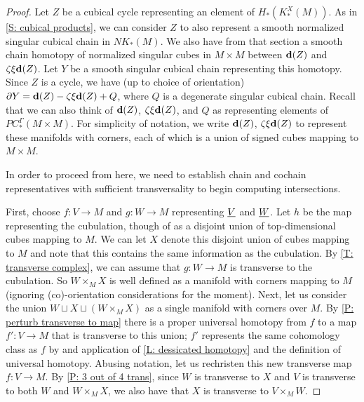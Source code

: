 \documentclass{amsart}
\begin{document}
\begin{proof}
Let $Z$ be a cubical cycle representing an element of $H_*(K_*^X(M))$. As in \cref{S: cubical products}, we can consider $Z$ to also represent a smooth normalized singular cubical chain in $NK_*(M)$. We also have from that section a smooth chain homotopy of normalized singular cubes  in $M\times M$ between $\mathbf{d}(Z)$ and $\zeta\xi\mathbf{d}(Z)$. Let $Y$ be a smooth singular cubical chain representing this homotopy. Since $Z$ is a cycle, we have (up to choice of orientation) $\partial Y=\mathbf{d}(Z)-\zeta\xi\mathbf{d}(Z)+Q$, where $Q$ is a degenerate singular cubical chain. Recall that we can also think of $\mathbf{d}(Z)$, $\zeta\xi\mathbf{d}(Z)$, and $Q$ as representing elements of $PC^\Gamma_*(M\times M)$. For simplicity of notation, we write $\mathbf{d}(Z)$, $\zeta\xi\mathbf{d}(Z)$ to represent these manifolds with corners, each of which is a union of signed cubes mapping to $M\times M$.

In order to proceed from here, we need to establish chain and cochain representatives with sufficient transversality to begin computing intersections.

First, choose $f:V\to M$ and $g:W\to M$ representing $\underline{V}$ and $\underline{W}$. Let $h$ be the map representing the cubulation, though of as a disjoint union of top-dimensional cubes mapping to $M$. We can let $X$ denote this disjoint union of cubes mapping to $M$ and note that this contains the same information as the cubulation. By \cref{T: transverse complex}, we can assume that $g:W\to M$ is transverse to the cubulation. So $W\times_MX$ is well defined as a manifold with corners mapping to $M$ (ignoring (co)-orientation considerations for the moment).
Next, let us consider the union $W\sqcup X\sqcup (W\times_M X)$ as a single manifold with corners over $M$. By \cref{P: perturb transverse to map} there is a proper universal homotopy from $f$ to a map $f':V\to M$ that is transverse to this union; $f'$ represents the same cohomology class as $f$ by and application of \cref{L: dessicated homotopy} and the definition of universal homotopy. Abusing notation, let us rechristen this new transverse map $f:V\to M$.  By \cref{P: 3 out of 4 trans}, since $W$ is transverse to $X$ and $V$ is transverse to both $W$ and $W\times_MX$, we also have that $X$ is transverse to $V\times_M W$.


\end{proof}
\end{document}
